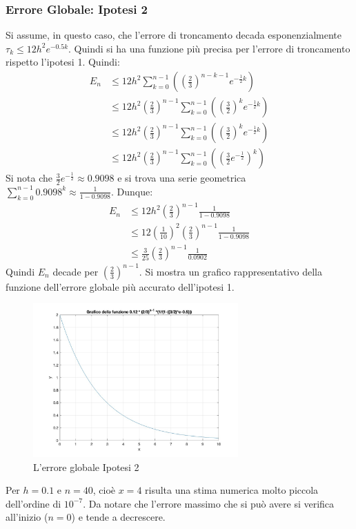 \documentclass[11pt]{article}
\begin{document}
\subsubsection{Errore Globale: Ipotesi 2}
Si assume, in questo caso, che l'errore di troncamento decada esponenzialmente $\tau_k\leq12h^2e^{-0.5k}$. Quindi si ha una funzione più precisa per l'errore di troncamento rispetto l'ipotesi 1. Quindi:
\begin{align}
	E_n&\leq12h^2\sum^{n-1}_{k=0}\left(\left(\frac{2}{3} \right)^{n-k-1}e^{-\frac{1}{2}k}\right)\\
	&\leq12h^2\left(\frac{2}{3} \right)^{n-1}\sum^{n-1}_{k=0}\left(\left(\frac{3}{2} \right)^{k}e^{-\frac{1}{2}k}\right)\\
	&\leq12h^2\left(\frac{2}{3} \right)^{n-1}\sum^{n-1}_{k=0}\left(\left(\frac{3}{2} \right)^{k}e^{-\frac{1}{2}k}\right)\\
	&\leq12h^2\left(\frac{2}{3} \right)^{n-1}\sum^{n-1}_{k=0}\left(\left( \frac{3}{2}e^{-\frac{1}{2}}\right)^k\right)
\end{align}
Si nota che $\frac{3}{2}e^{-\frac{1}{2}}\approx0.9098$ e si trova una serie geometrica $\sum^{n-1}_{k=0}0.9098^k\approx\frac{1}{1-0.9098}$. Dunque:
\begin{align}
	E_n&\leq12h^2\left(\frac{2}{3} \right)^{n-1}\frac{1}{1-0.9098}\\
	&\leq12\left(\frac{1}{10}\right)^2\left(\frac{2}{3} \right)^{n-1}\frac{1}{1-0.9098}\\
	&\leq\frac{3}{25}\left(\frac{2}{3} \right)^{n-1}\frac{1}{0.0902}
\end{align}
Quindi $E_n$ decade per $\left(\frac{2}{3}\right)^{n-1}$. Si mostra un grafico rappresentativo della funzione dell'errore globale più accurato dell'ipotesi 1.
\begin{figure}[H]
  \centering
  \includegraphics[width=0.7\textwidth]{images/fig4.jpg} 
  \caption{L'errore globale Ipotesi 2}
  \label{fig:funzione}
\end{figure}
Per $h=0.1$ e $n=40$, cioè $x=4$ risulta una stima numerica molto piccola dell'ordine di $10^{-7}$. Da notare che l'errore massimo che si può avere si verifica all'inizio ($n=0$) e tende a decrescere.
\end{document}

